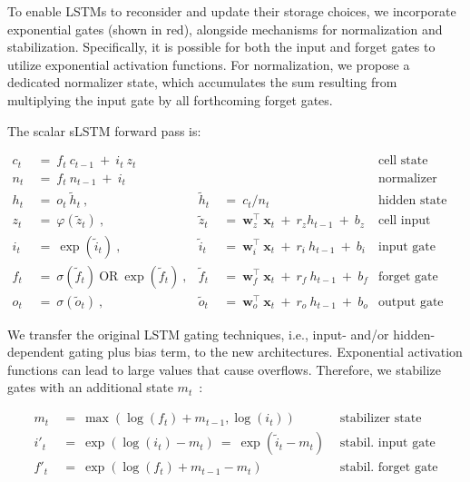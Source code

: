 To enable LSTMs to reconsider and update their storage choices, we incorporate exponential gates (shown in red), alongside mechanisms for normalization and stabilization. Specifically, it is possible for both the input and forget gates to utilize exponential activation functions. For normalization, we propose a dedicated normalizer state, which accumulates the sum resulting from multiplying the input gate by all forthcoming forget gates.

The scalar sLSTM forward pass is:

\begin{align}
\label{eq:slstmforward}
c_t \ &= \  f_t \ c_{t-1} \ + \ i_t \ z_t & & 
 &\text{cell state} \\
n_t \ &= \  f_t \ n_{t-1} \ + \ i_t  & & 
 &\text{normalizer state} \\
h_t \ &= \ o_t \ \tilde{h}_t \ ,
  &\tilde{h}_t \ &= \ c_t / n_t
&\text{hidden state} \\
z_t \ &= \ \varphi \left( \tilde{z}_t \right) \ , 
  &\tilde{z}_t \ &=  \ \mathbf{w}^\top_{z} \ \mathbf{x}_t \ + \
  r_{z}  h_{t-1} \ + \  b_{z}
  &\text{cell input} \\
i_t \ &= \ \!\exp \left( \tilde{i}_t  \right) \ , 
  &\tilde{i}_t \ &= \ \mathbf{w}^\top_{i} \ \mathbf{x}_t \ + \
  r_{i}  \ h_{t-1} \ + \  b_{i}
  &\text{input gate} \\
f_t \ &= \ \sigma \left(  \tilde{f}_t \right) \ \text{OR} \
\!\exp \left(  \tilde{f}_t \right) \ ,
  &\tilde{f}_t \ &= \ \mathbf{w}^\top_{f} \ \mathbf{x}_t  \ + \
  r_{f}  \ h_{t-1} \ + \  b_{f}
  &\text{forget gate} \\
o_t \ &= \ \sigma \left( \tilde{o}_t \right) \ , 
  &\tilde{o}_t  \ &= \ \mathbf{w}^\top_{o} \ \mathbf{x}_t \ + \
  r_{o}  \ h_{t-1} \ + \  b_{o}
  &\text{output gate} 
\end{align}

We transfer the original LSTM gating techniques, i.e., input- and/or hidden-dependent gating plus bias term, to the new architectures. Exponential activation functions can lead to large values that cause overflows. Therefore, we stabilize gates with an additional state \mbox{$m_t$~\citep{Milakov:18arxiv}}:

\begin{align}
\label{eq:slstmstabil}
m_t \ &= \ \max \left( \log ( f_t ) + m_{t-1} , \log ( i_t ) \right) &\text{stabilizer state} \\
i'_t \ &= \ \!\exp \left( \log \left ( i_t \right) - m_t \right) \ = \ \!\exp \left( \tilde{i}_t - m_t \right) \ \, 
  &\text{stabil. input gate} \\
f'_t \ &= \ \!\exp \left( \log \left( f_t \right) + m_{t-1} - m_t \right) \ \, 
  &\text{stabil. forget gate}
\end{align}

